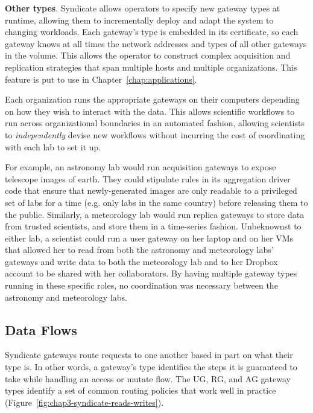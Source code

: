 \textbf{Other types}.  Syndicate allows operators to specify new gateway types at runtime, allowing
them to incrementally deploy and adapt the system to changing workloads.  Each
gateway's type is embedded in its certificate, so each gateway knows at all
times the network addresses and types of all other gateways in the volume.
This allows the operator to construct complex acquisition and replication
strategies that span multiple hosts and multiple organizations.
This feature is put to use in Chapter~\ref{chap:applications}.

Each organization runs the appropriate gateways on their computers depending on
how they wish to interact with the data.  This allows scientific workflows to
run across organizational boundaries in an automated fashion, allowing
scientists to \emph{independently} devise new workflows without incurring the
cost of coordinating with each lab to set it up.

For example, an astronomy lab would
run acquisition gateways to expose telescope images of earth.  They could stipulate rules
in its aggregation driver code that ensure that newly-generated images are only
readable to a privileged set of labs for a time (e.g. only labs in the same
country) before releasing them to the public.  Similarly, a meteorology
lab would run replica gateways to store data from trusted scientists, and
store them in a time-series fashion.  Unbeknownst to either lab, a scientist could
run a user gateway on her laptop and on her VMs that allowed her to read from both the
astronomy and meteorology labs' gateways and write data to both the meteorology
lab and to her Dropbox account to be shared with her collaborators.  By having
multiple gateway types running in these specific roles, no coordination was
necessary between the astronomy and meteorology labs.

\subsection{Data Flows}

Syndicate gateways route requests to one another based in part on what their
type is.  In other words, a gateway's type identifies the steps it is guaranteed
to take while handling an access or mutate flow.
The UG, RG, and AG gateway types identify a set of common routing policies that
work well in practice
(Figure~\ref{fig:chap3-syndicate-reads-writes}).

